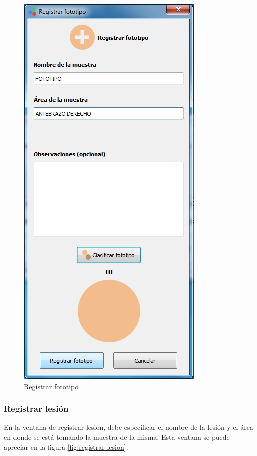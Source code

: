 \begin{figure}[H]
  \centering
  \includegraphics[width=.5\linewidth]{./img/registrar-fototipo2.jpg}
\caption[]{Registrar fototipo\label{fig:registrar-fototipo2}}
\end{figure}
\newpage	

\subsubsection*{Registrar lesi\'{o}n}
			En la ventana de registrar lesi\'{o}n, debe especificar el nombre de la lesi\'{o}n y el \'{a}rea en donde se est\'{a} tomando la muestra de la misma. Esta ventana se puede apreciar en la figura \ref{fig:registrar-lesion}.
		
